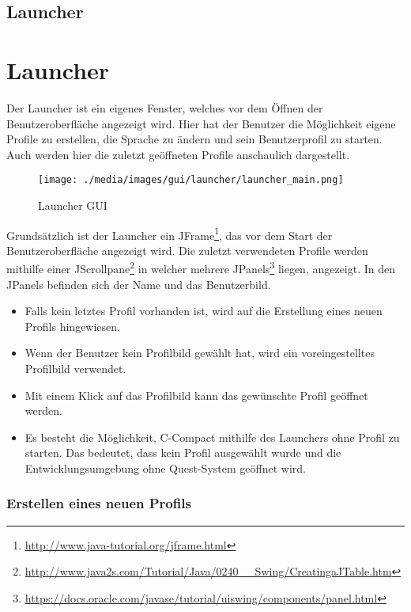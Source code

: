 \iffabian
	\subsection{Launcher}
	\label{sec:win-launcher}
\else
	\section{Launcher}
	\label{sec:win-launcher}
\fi
Der Launcher ist ein eigenes Fenster, welches vor dem Öffnen der Benutzeroberfläche angezeigt wird. Hier hat der Benutzer die Möglichkeit eigene Profile zu erstellen, die Sprache zu ändern und sein Benutzerprofil zu starten. Auch werden hier die zuletzt geöffneten Profile anschaulich dargestellt.

\begin{figure}[h] 
  \centering
     \texttt{[image: ./media/images/gui/launcher/launcher\_main.png]}
  \caption{Launcher GUI}
  \label{fig:launcher_GUI}
\end{figure}

Grundsätzlich ist der Launcher ein JFrame\footnote{\url{http://www.java-tutorial.org/jframe.html}}, das vor dem Start der Benutzeroberfläche angezeigt wird. Die zuletzt verwendeten Profile werden mithilfe einer JScrollpane\footnote{\url{http://www.java2s.com/Tutorial/Java/0240__Swing/CreatingaJTable.htm}}  in welcher mehrere JPanels\footnote{\url{https://docs.oracle.com/javase/tutorial/uiswing/components/panel.html}} liegen, angezeigt. In den JPanels befinden sich der Name und das Benutzerbild.

\begin{itemize}
\item Falls kein letztes Profil vorhanden ist, wird auf die Erstellung eines neuen Profils hingewiesen.
\item Wenn der Benutzer kein Profilbild gewählt hat, wird ein voreingestelltes Profilbild verwendet.
\item Mit einem Klick auf das Profilbild kann das gewünschte Profil geöffnet werden.
\item Es besteht die Möglichkeit, C-Compact mithilfe des Launchers ohne Profil zu starten. Das bedeutet, dass kein Profil ausgewählt wurde und die Entwicklungsumgebung ohne Quest-System geöffnet wird.
\end{itemize}

\iffabian
	\subsubsection*{Erstellen eines neuen Profils}
\else
